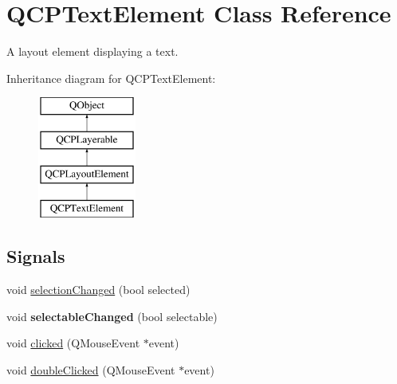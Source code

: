 \hypertarget{class_q_c_p_text_element}{}\section{Q\+C\+P\+Text\+Element Class Reference}
\label{class_q_c_p_text_element}


A layout element displaying a text.  


Inheritance diagram for Q\+C\+P\+Text\+Element\+:\begin{figure}[H]
\begin{center}
\leavevmode
\includegraphics[height=4.000000cm]{class_q_c_p_text_element}
\end{center}
\end{figure}
\subsection*{Signals}
\begin{DoxyCompactItemize}
\item 
void \hyperlink{class_q_c_p_text_element_a49f45b87ee9c1fe866c2cdd12af17a9a}{selection\+Changed} (bool selected)
\item 
\mbox{\label{class_q_c_p_text_element_ac4567260b52d02bfbad63357d13986c5}} 
void {\bfseries selectable\+Changed} (bool selectable)
\item 
void \hyperlink{class_q_c_p_text_element_ad2246a0e701c0655623f048737298334}{clicked} (Q\+Mouse\+Event $\ast$event)
\item 
void \hyperlink{class_q_c_p_text_element_a9c6fd27ae8a7c3a02df7a6bbd3509e40}{double\+Clicked} (Q\+Mouse\+Event $\ast$event)
\end{DoxyCompactItemize}
